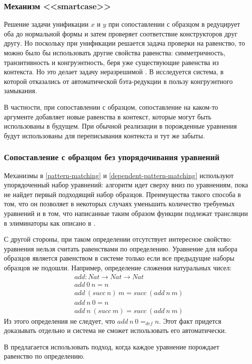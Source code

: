 \subsubsection{Механизм <<smartcase>>}

Решение задачи унификации \(x\) и \(y\) при сопоставлении с образцом в
\cite{dependent-pattern-matching} редуцирует оба до нормальной формы и затем
проверяет соответствие конструкторов друг другу. Но поскольку при унификации
решается задача проверки на равенство, то можно было бы использовать другие
свойства равенства: симметричность, транзитивность и конгруэнтность, беря уже
существующие равенства из контекста. Но это делает задачу неразрешимой
\cite{programming-up-to-congruence}. В \cite{programming-up-to-congruence}
исследуется система, в которой отказались от автоматической бэта-редукции в
пользу конгруэнтного замыкания.

В частности, при сопоставлении с образцом, сопоставление на каком-то аргументе
добавляет новые равенства в контекст, которые могут быть использованы в будущем.
При обычной реализации в \cite{dependent-pattern-matching} порожденные уравнения
будут использованы для переписывания контекста и тут же забыты.

\subsubsection{Сопоставление с образцом без упорядочивания уравнений}

Механизмы в \ref{pattern-matching} и \ref{dependent-pattern-matching} используют
упорядоченный набор уравнений: алгоритм идет сверху вниз по уравнениям, пока не
найдет первый подходящий набор образцов. Преимущества такого способа в том,
что он позволяет в некоторых случаях уменьшить количество требуемых уравнений
\cite{overlapping-and-order-independent-patterns} и в том, что написанные таким
образом функции подлежат трансляции в элиминаторы как описано в
\cite{eliminating-dependent-pattern-matching}.

С другой стороны, при таком определении отсутствует интересное свойство:
уравнения нельзя считать равенствами по определению. Уравнение для набора
образцов является равенством в системе только если все предыдущие наборы
образцов не подошли. Например, определение сложения натуральных чисел:
\begin{align*}
&add : Nat \to Nat \to Nat\\
&add\ 0\ n = n\\
&add\ (succ\ n)\ m = succ\ (add\ n\ m)\\
&add\ n\ 0 = n\\
&add\ n\ (succ\ m) = succ\ (add\ n\ m)
\end{align*}
Из этого определения не следует, что \(add\ n\ 0 =_{def} n\). Этот факт придется
доказывать отдельно и система не сможет использовать его автоматически.

В \cite{overlapping-and-order-independent-patterns} предлагается использовать
подход, когда каждое уравнение порождает равенство по определению.
